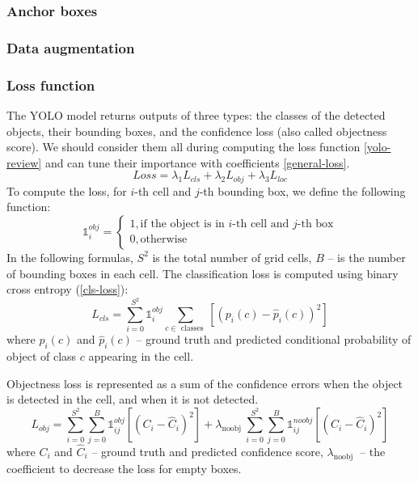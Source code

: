 \documentclass[14pt,a4paper]{extarticle}
\newcounter{e}
\numberwithin{equation}{section}
\numberwithin{figure}{section}
\begin{document}
\subsubsection{Anchor boxes}
\subsubsection{Data augmentation}
\subsubsection{Loss function}
The YOLO model returns outputs of three types: the classes of the detected objects, their bounding boxes, and the confidence loss (also called objectness score). We should consider them all during computing the loss function \ref{yolo-review} and can tune their importance with coefficients \ref{general-loss}.
\begin{equation}
\label{general-loss}
Loss=\lambda_1 L_{c l s}+\lambda_2 L_{o b j}+\lambda_3 L_{l o c}
\end{equation}
To compute the loss, for $i$-th cell and $j$-th bounding box, we define the following function:
\begin{equation}
\mathds{1}_i^{o b j} = \left\{
    \begin{array}{l}
       1, \text{if the object is in $i$-th cell and $j$-th box} \\
       0, \text{otherwise}
    \end{array}
\right.
\end{equation}
In the following formulas, $S^2$ is the total number of grid cells, $B$ -- is the number of bounding boxes in each cell. 
The classification loss is computed using binary cross entropy (\ref{cls-loss}):
\begin{equation}
\label{cls-loss}
L_{c l s} = \sum_{i=0}^{S^2} \mathds{1}_i^{o b j} \sum_{c \in \text { classes }}\left[\left(p_i(c)-\widehat{p}_i(c)\right)^2\right]
\end{equation}
where $p_i(c)$ and $\widehat{p}_i(c)$ -- ground truth and predicted conditional probability of object of class $c$ appearing in the cell.

Objectness loss is represented as a sum of the confidence errors when the object is detected in the cell, and when it is not detected.
\begin{equation}
L_{o b j} = \sum_{i=0}^{S^2} \sum_{j=0}^B \mathds{1}_{i j}^{o b j}\left[\left(C_i-\widehat{C}_i\right)^2\right] 
+
\lambda_{\text {noobj }} \sum_{i=0}^{S^2} \sum_{j=0}^B \mathds{1}_{i j}^{n o o b j}\left[\left(C_i-\widehat{C}_i\right)^2\right]
\end{equation}
where $C_i$ and $\widehat{C}_i$ -- ground truth and predicted confidence score, $\lambda_{\text {noobj }}$ -- the coefficient to decrease the loss for empty boxes.
\end{document}
